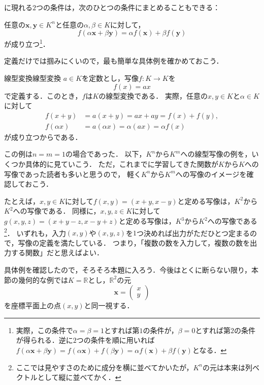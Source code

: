 に現れる$2$つの条件は，次のひとつの条件にまとめることもできる：

任意の$\bm{x}, \bm{y} \in K^n$と任意の$\alpha, \beta \in K$に対して，
\[
  f(\alpha\bm{x} + \beta\bm{y}) = \alpha f(\bm{x}) + \beta f(\bm{y})
\]
が成り立つ\footnote{実際，この条件で$\alpha = \beta = 1$とすれば第$1$の条件が，$\beta = 0$とすれば第$2$の条件が得られる．逆に$2$つの条件を順に用いれば$f(\alpha\bm{x} + \beta\bm{y}) = f(\alpha\bm{x}) + f(\beta\bm{y}) = \alpha f(\bm{x}) + \beta f(\bm{y})$となる．}．

定義だけでは掴みにくいので，最も簡単な具体例を確かめておこう．

\begin{example}{線型変換}{線型変換}
  $a \in K$を定数とし，写像$f \colon K \to K$を
  \[
    f(x) = ax
  \]
  で定義する．このとき，$f$は$K$の線型変換である．
  実際，任意の$x, y \in K$と$\alpha \in K$に対して
  \begin{align*}
    f(x + y) &= a(x + y) = ax + ay = f(x) + f(y), \\
    f(\alpha x) &= a(\alpha x) = \alpha(ax) = \alpha f(x)
  \end{align*}
  が成り立つからである．
\end{example}

この例は$n = m = 1$の場合であった．
以下，$K^n$から$K^m$への線型写像の例を，いくつか具体的に見ていこう．
ただ，これまでに学習してきた関数が$K$から$K$への写像であった読者も多いと思うので，
軽く$K^n$から$K^m$への写像のイメージを確認しておこう．

たとえば，$x, y \in K$に対して$f(x,y)=(x+y, x-y)$と定める写像は，$K^2$から$K^2$への写像である．
同様に，$x, y, z \in K$に対して$g(x,y,z)=(x+y-z, x-y+z)$と定める写像は，$K^3$から$K^2$への写像である\footnote{ここでは見やすさのために成分を横に並べてかいたが，$K^n$の元は本来は列ベクトルとして縦に並べてかく．}．
いずれも，入力$(x, y)$や$(x, y, z)$を$1$つ決めれば出力がただひとつ定まるので，写像の定義を満たしている．
つまり，「複数の数を入力して，複数の数を出力する関数」だと思えばよい．

具体例を確認したので，そろそろ本題に入ろう．今後はとくに断らない限り，本節の幾何的な例では$K = \mathbb{R}$とし，$\mathbb{R}^2$の元
\[
  \bm{x} = \begin{pmatrix} x \\ y \end{pmatrix}
\]
を座標平面上の点$(x, y)$と同一視する．

